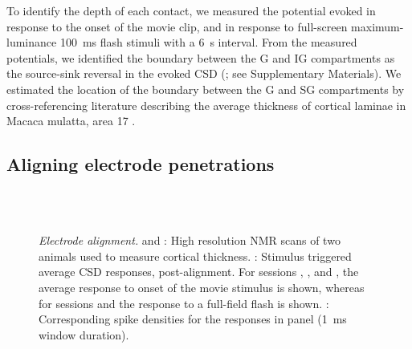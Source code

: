 To identify the depth of each contact, we measured the potential evoked in response to the onset of the movie clip, and in response to full-screen maximum-luminance \SI{100}{\milli\second} flash stimuli with a \SI{6}{\second} interval.
From the measured potentials, we identified the boundary between the \ac{G} and \ac{IG} compartments as the source-sink reversal in the evoked \ac{CSD} (\citealp{Mitzdorf1979,Mitzdorf1985}; see Supplementary Materials).
We estimated the location of the boundary between the \ac{G} and \ac{SG} compartments by cross-referencing literature describing the average thickness of cortical laminae in Macaca mulatta, area 17 \citep{Lund1973,OKusky1982}.


\subsection{Aligning electrode penetrations}

\begin{figure}
    \hspace*{\fill}
    \hspace*{\fill}\hspace{.2cm}\hspace*{\fill}
    \hspace*{\fill}
    \\
    \\
%
\caption{%
\textit{Electrode alignment.}
\protect{} and \protect{}: High resolution \ac{NMR} scans of two animals used to measure cortical thickness.
\protect{}: Stimulus triggered average \ac{CSD} responses, post-alignment.
For sessions , ,  and , the average response to onset of the movie stimulus is shown, whereas for sessions  and  the response to a full-field flash is shown.
\protect{}: Corresponding spike densities for the responses in panel \protect{} (\SI{1}{\milli\second} window duration).
}
\label{fig:lam_s1}
%
\end{figure}


